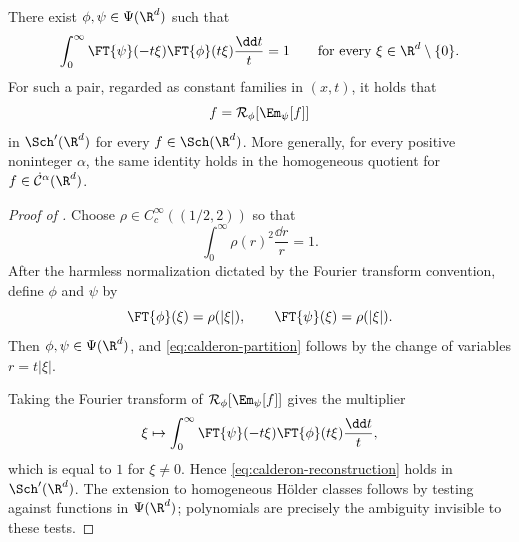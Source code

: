 {}

\begin{lemma}
  \label{lem:continuous-calderon}
  There exist \(\phi, \psi \in \Psi(\R^d)\) such that
  \begin{equation}
    \label{eq:calderon-partition}
    \int_0^{\infty}
    \FT{\psi}(-t\xi)\FT{\phi}(t\xi)
    \frac{\dd t}{t}
    =
    1
    \qquad
    \text{for every } \xi \in \R^d \setminus \{0\}.
  \end{equation}
  For such a pair, regarded as constant families in \((x,t)\), it holds that
  \begin{equation}
    \label{eq:calderon-reconstruction}
    f =
    \mathcal{R}_{\phi}[\Em_{\psi}[f]]
  \end{equation}
  in \(\Sch'(\R^d)\) for every \(f \in \Sch(\R^d)\). More generally, for every
  positive noninteger \(\alpha\), the same identity holds in the homogeneous
  quotient for \(f \in \dot{\mathcal{C}}^{\alpha}(\R^d)\).
\end{lemma}

\begin{proof}[Proof of ]
  Choose \(\rho \in C_c^{\infty}((1/2, 2))\) so that
  \[
    \int_0^{\infty} \rho(r)^2 \frac{\dd r}{r} = 1.
  \]
  After the harmless normalization dictated by the Fourier transform
  convention, define \(\phi\) and \(\psi\) by
  \[
    \FT{\phi}(\xi) = \rho(|\xi|),
    \qquad
    \FT{\psi}(\xi) = \rho(|\xi|).
  \]
  Then \(\phi, \psi \in \Psi(\R^d)\), and
  \eqref{eq:calderon-partition} follows by the change of variables
  \(r = t|\xi|\).

  Taking the Fourier transform of
  \(\mathcal{R}_{\phi}[\Em_{\psi}[f]]\) gives the multiplier
  \[
    \xi
    \mapsto
    \int_0^{\infty}
    \FT{\psi}(-t\xi)\FT{\phi}(t\xi)
    \frac{\dd t}{t},
  \]
  which is equal to \(1\) for \(\xi \neq 0\). Hence
  \eqref{eq:calderon-reconstruction} holds in \(\Sch'(\R^d)\). The extension
  to homogeneous H{\"o}lder classes follows by testing against functions in
  \(\Psi(\R^d)\); polynomials are precisely the ambiguity invisible to these
  tests.
\end{proof}

